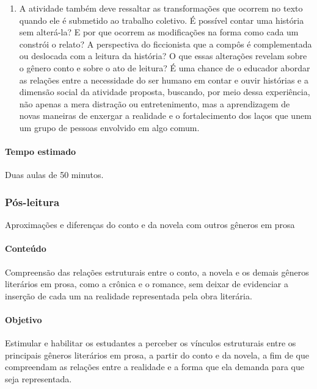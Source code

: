 \documentclass[12pt]{extarticle}
\begin{document}
\begin{enumerate}
\item
A atividade também deve ressaltar as transformações que ocorrem no
texto quando ele é submetido ao trabalho coletivo. É possível contar uma
história sem alterá-la? E por que ocorrem as modificações na forma como
cada um constrói o relato? A perspectiva do ficcionista que a compôs é
complementada ou deslocada com a leitura da história? O que essas
alterações revelam sobre o gênero conto e sobre o ato de leitura? É uma
chance de o educador abordar as relações entre a necessidade do ser
humano em contar e ouvir histórias e a dimensão social da atividade
proposta, buscando, por meio dessa experiência, não apenas a mera
distração ou entretenimento, mas a aprendizagem de novas maneiras de
enxergar a realidade e o fortalecimento dos laços que unem um grupo de
pessoas envolvido em algo comum.
\end{enumerate}

\paragraph{Tempo estimado} Duas aulas de 50 minutos.



\subsubsection{Pós-leitura} Aproximações e diferenças do conto e da novela 
com outros gêneros em prosa 



\paragraph{Conteúdo} Compreensão das relações estruturais entre o conto, a
novela e os demais gêneros literários em prosa, como a crônica e o
romance, sem deixar de evidenciar a inserção de cada um na realidade
representada pela obra literária.

\paragraph{Objetivo} Estimular e habilitar os estudantes a perceber os
vínculos estruturais entre os principais gêneros literários em prosa, a
partir do conto e da novela, a fim de que compreendam as relações entre
a realidade e a forma que ela demanda para que seja representada.
\end{document}
